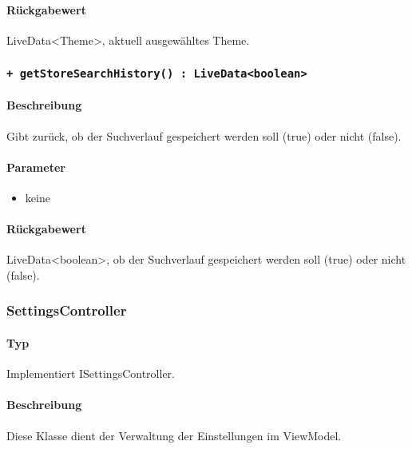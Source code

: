 \paragraph*{Rückgabewert}
LiveData<Theme>, aktuell ausgewähltes Theme.

\subsubsection*{\texttt{+ getStoreSearchHistory() : LiveData<boolean>}}%
\paragraph*{Beschreibung}
Gibt zurück, ob der Suchverlauf gespeichert werden soll (true) oder nicht (false).
\paragraph*{Parameter}
\begin{itemize}
    \item keine
\end{itemize}
\paragraph*{Rückgabewert}
LiveData<boolean>, ob der Suchverlauf gespeichert werden soll (true) oder nicht (false).

\subsubsection{SettingsController}
\paragraph*{Typ}
Implementiert ISettingsController.
\paragraph*{Beschreibung}
Diese Klasse dient der Verwaltung der Einstellungen im ViewModel.
